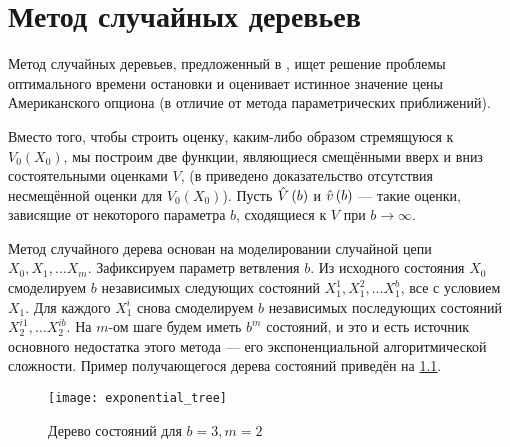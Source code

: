 \chapter{Метод случайных деревьев}\label{chapter:2}

Метод случайных деревьев, предложенный в \cite{Broadie1997}, ищет решение проблемы оптимального времени остановки и оценивает истинное значение цены Американского опциона (в отличие от метода параметрических приближений).

\par Вместо того, чтобы строить оценку, каким-либо образом стремящуюся к $V_0\left(X_0\right)$, мы построим две функции, являющиеся смещёнными вверх и вниз состоятельными оценками $V$, (в \cite{Broadie1997} приведено доказательство отсутствия несмещённой оценки для $V_0\left(X_0\right)$). Пусть $\hat{V}\left(b\right)$ и $\hat{v}\left(b\right)$ --- такие оценки, зависящие от некоторого параметра $b$, сходящиеся к $V$ при $b\to\infty$.
\par Метод случайного дерева основан на моделировании случайной цепи $X_0, X_1, \ldots X_m$. Зафиксируем параметр ветвления $b$. Из исходного состояния $X_0$ смоделируем $b$ независимых следующих состояний $X_1^1, X_1^2, \ldots X_1^b$, все с условием $X_1$. Для каждого $X_1^i$ снова смоделируем $b$ независимых последующих состояний $X_2^{i1}, \ldots X_2^{ib}$. На $m$-ом шаге будем иметь $b^m$ состояний, и это и есть источник основного недостатка этого метода --- его экспоненциальной алгоритмической сложности. Пример получающегося дерева состояний приведён на \ref{fig:exponential_tree}.
\begin{figure}
	\centering
	\texttt{[image: exponential\_tree]}
	\caption{Дерево состояний для $b = 3, m = 2$}
	\label{fig:exponential_tree}
\end{figure}
